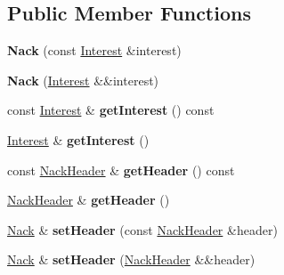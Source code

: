 \subsection*{Public Member Functions}
\begin{DoxyCompactItemize}
\item 
{\bfseries Nack} (const \hyperlink{classndn_1_1Interest}{Interest} \&interest)\hypertarget{classndn_1_1lp_1_1Nack_a51f3aec7f266eeb1680148184891a972}{}\label{classndn_1_1lp_1_1Nack_a51f3aec7f266eeb1680148184891a972}

\item 
{\bfseries Nack} (\hyperlink{classndn_1_1Interest}{Interest} \&\&interest)\hypertarget{classndn_1_1lp_1_1Nack_a8de92a876232f334d58f582b81b0e04a}{}\label{classndn_1_1lp_1_1Nack_a8de92a876232f334d58f582b81b0e04a}

\item 
const \hyperlink{classndn_1_1Interest}{Interest} \& {\bfseries get\+Interest} () const\hypertarget{classndn_1_1lp_1_1Nack_a17c1f239cf4f11b745f62f5631d7c872}{}\label{classndn_1_1lp_1_1Nack_a17c1f239cf4f11b745f62f5631d7c872}

\item 
\hyperlink{classndn_1_1Interest}{Interest} \& {\bfseries get\+Interest} ()\hypertarget{classndn_1_1lp_1_1Nack_ab0998e6bb755ac89a49df4989a9a1b14}{}\label{classndn_1_1lp_1_1Nack_ab0998e6bb755ac89a49df4989a9a1b14}

\item 
const \hyperlink{classndn_1_1lp_1_1NackHeader}{Nack\+Header} \& {\bfseries get\+Header} () const\hypertarget{classndn_1_1lp_1_1Nack_aceafe7495c11bf0fa61d7a45a0850768}{}\label{classndn_1_1lp_1_1Nack_aceafe7495c11bf0fa61d7a45a0850768}

\item 
\hyperlink{classndn_1_1lp_1_1NackHeader}{Nack\+Header} \& {\bfseries get\+Header} ()\hypertarget{classndn_1_1lp_1_1Nack_abe3dca92ee566a1dcb684d0096c65f4a}{}\label{classndn_1_1lp_1_1Nack_abe3dca92ee566a1dcb684d0096c65f4a}

\item 
\hyperlink{classndn_1_1lp_1_1Nack}{Nack} \& {\bfseries set\+Header} (const \hyperlink{classndn_1_1lp_1_1NackHeader}{Nack\+Header} \&header)\hypertarget{classndn_1_1lp_1_1Nack_a2c2144613c74dd3493e2289cd7764389}{}\label{classndn_1_1lp_1_1Nack_a2c2144613c74dd3493e2289cd7764389}

\item 
\hyperlink{classndn_1_1lp_1_1Nack}{Nack} \& {\bfseries set\+Header} (\hyperlink{classndn_1_1lp_1_1NackHeader}{Nack\+Header} \&\&header)\hypertarget{classndn_1_1lp_1_1Nack_a9f87f79a763c1bbe3e3eedc1c1e06426}{}\label{classndn_1_1lp_1_1Nack_a9f87f79a763c1bbe3e3eedc1c1e06426}


\end{DoxyCompactItemize}

